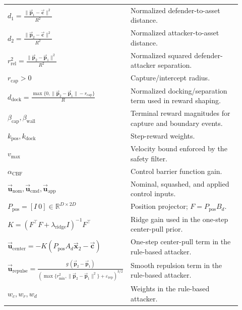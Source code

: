 \begin{longtable}{>{\raggedright\arraybackslash}p{0.42\linewidth}
                  >{\raggedright\arraybackslash}p{0.50\linewidth}}
\(d_1=\tfrac{\|\vec{\mathbf{p}}_1-\vec{\mathbf{c}}\|^2}{R^2}\) & Normalized defender-to-asset distance.\\
\(d_2=\tfrac{\|\vec{\mathbf{p}}_2-\vec{\mathbf{c}}\|^2}{R^2}\) & Normalized attacker-to-asset distance.\\
\(r_{\mathrm{rel}}^2=\tfrac{\|\vec{\mathbf{p}}_2-\vec{\mathbf{p}}_1\|^2}{R^2}\) & Normalized squared defender-attacker separation.\\
\(r_{\mathrm{cap}}>0\) & Capture/intercept radius.\\
\(d_{\mathrm{dock}}=\tfrac{\max\{0,\|\vec{\mathbf{p}}_2-\vec{\mathbf{p}}_1\|-r_{\mathrm{cap}}\}}{R}\) & Normalized docking/separation term used in reward shaping.\\
\(\beta_{\mathrm{cap}},\beta_{\mathrm{wall}}\) & Terminal reward magnitudes for capture and boundary events.\\
\(k_{\mathrm{pos}},k_{\mathrm{dock}}\) & Step-reward weights.\\[2pt]

\(v_{\max}\) & Velocity bound enforced by the safety filter.\\
\(\alpha_{\mathrm{CBF}}\) & Control barrier function gain.\\
\(\vec{\mathbf{u}}_{\mathrm{nom}},\vec{\mathbf{u}}_{\mathrm{cmd}},\vec{\mathbf{u}}_{\mathrm{app}}\) & Nominal, squashed, and applied control inputs.\\
\(P_{\mathrm{pos}}=[I~0]\in\mathbb{R}^{D\times 2D}\) & Position projector; \(F=P_{\mathrm{pos}}B_d\).\\
\(K=(F^\top F+\lambda_{\mathrm{ridge}} I)^{-1}F^\top\) & Ridge gain used in the one-step center-pull prior.\\
\(\vec{\mathbf{u}}_{\mathrm{center}}=-K(P_{\mathrm{pos}}A_d\vec{\mathbf{x}}_2-\vec{\mathbf{c}})\) & One-step center-pull term in the rule-based attacker.\\
\(\vec{\mathbf{u}}_{\mathrm{repulse}}=\tfrac{g\,(\vec{\mathbf{p}}_2-\vec{\mathbf{p}}_1)}{(\max\{r_{\min}^2,\|\vec{\mathbf{p}}_2-\vec{\mathbf{p}}_1\|^2\}+\varepsilon_{\mathrm{rep}})^{3/2}}\) & Smooth repulsion term in the rule-based attacker.\\
\(w_c,w_r,w_d\) & Weights in the rule-based attacker.\\[2pt]


\end{longtable}
